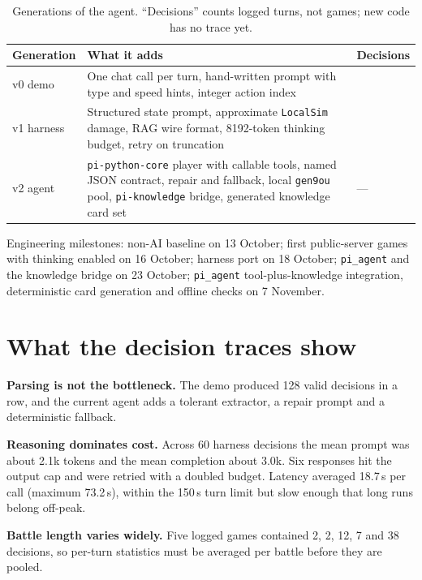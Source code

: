 \documentclass[11pt,a4paper]{article}
\newcommand{\code}[1]{\texttt{#1}}
\begin{document}
\begin{table}[t]
\centering
\small
\caption{Generations of the agent. ``Decisions'' counts logged turns, not games; new code has no trace yet.}
\label{tab:gens}
\begin{tabularx}{\textwidth}{@{}>{\raggedright\arraybackslash}p{2.1cm} >{\raggedright\arraybackslash}X >{\raggedleft\arraybackslash}p{1.6cm}@{}}
\toprule
\textbf{Generation} & \textbf{What it adds} & \textbf{Decisions} \\
\midrule
v0 demo    & One chat call per turn, hand-written prompt with type and speed hints, integer action index
             & 128 \\
v1 harness & Structured state prompt, approximate \code{LocalSim} damage, RAG wire format, 8192-token
             thinking budget, retry on truncation & 61 \\
v2 agent   & \code{pi-python-core} player with callable tools, named JSON contract, repair and fallback,
             local \code{gen9ou} pool, \code{pi-knowledge} bridge, generated knowledge card set
             & --- \\
\bottomrule
\end{tabularx}
\end{table}

Engineering milestones: non-AI baseline on 13 October; first public-server games with thinking enabled on
16 October; harness port on 18 October; \code{pi\_agent} and the knowledge bridge on 23 October;
\code{pi\_agent} tool-plus-knowledge integration, deterministic card generation and offline checks on
7 November.

\section{What the decision traces show}
\label{sec:traces}

\textbf{Parsing is not the bottleneck.} The demo produced 128 valid decisions in a row, and the current agent
adds a tolerant extractor, a repair prompt and a deterministic fallback.

\textbf{Reasoning dominates cost.} Across 60 harness decisions the mean prompt was about 2.1k tokens and the
mean completion about 3.0k. Six responses hit the output cap and were retried with a doubled budget. Latency
averaged 18.7\,s per call (maximum 73.2\,s), within the 150\,s turn limit but slow enough that long runs belong
off-peak.

\textbf{Battle length varies widely.} Five logged games contained 2, 2, 12, 7 and 38 decisions, so per-turn
statistics must be averaged per battle before they are pooled.
\end{document}
